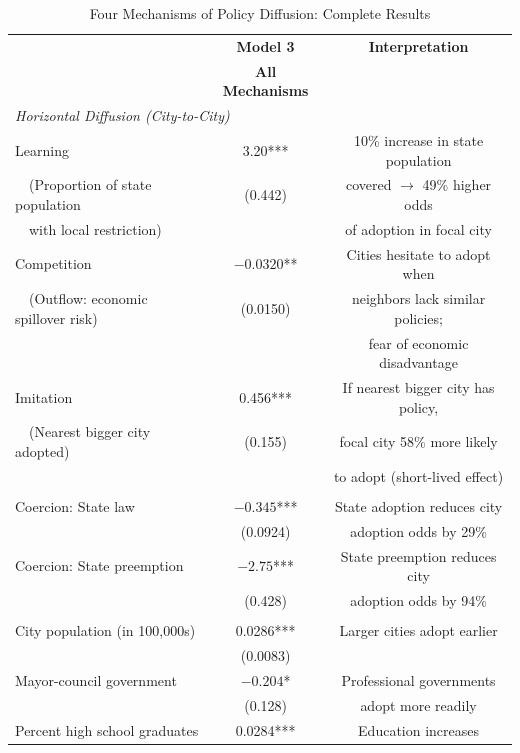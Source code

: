 \documentclass[12pt]{report}
\begin{document}
\begin{table}[htbp]
\centering
\caption{Four Mechanisms of Policy Diffusion: Complete Results \parencite{shipanMechanismsPolicyDiffusion2008a}}
\label{tab:shipan_volden_full}
\small
\begin{tabular}{lcc}
\toprule
& \textbf{Model 3} & \textbf{Interpretation} \\
& \textbf{All Mechanisms} & \\
\midrule
\multicolumn{3}{l}{\textit{Horizontal Diffusion (City-to-City)}} \\
\addlinespace
Learning & 3.20*** & 10\% increase in state population \\
~~(Proportion of state population & (0.442) & covered $\rightarrow$ 49\% higher odds \\
~~with local restriction) & & of adoption in focal city \\
\addlinespace
Competition & $-0.0320$** & Cities hesitate to adopt when \\
~~(Outflow: economic spillover risk) & (0.0150) & neighbors lack similar policies; \\
& & fear of economic disadvantage \\
\addlinespace
Imitation & 0.456*** & If nearest bigger city has policy, \\
~~(Nearest bigger city adopted) & (0.155) & focal city 58\% more likely \\
& & to adopt (short-lived effect) \\
\addlinespace
\midrule
\multicolumn{3}{l}{\textit{Vertical Diffusion (State-to-City)}} \\
\addlinespace
Coercion: State law & $-0.345$*** & State adoption reduces city \\
& (0.0924) & adoption odds by 29\% \\
\addlinespace
Coercion: State preemption & $-2.75$*** & State preemption reduces city \\
& (0.428) & adoption odds by 94\% \\
\addlinespace
\midrule
\multicolumn{3}{l}{\textit{Control Variables}} \\
\addlinespace
City population (in 100,000s) & 0.0286*** & Larger cities adopt earlier \\
& (0.0083) & \\
Mayor-council government & $-0.204$* & Professional governments \\
& (0.128) & adopt more readily \\
Percent high school graduates & 0.0284*** & Education increases \\

\end{tabular}
\end{table}
\end{document}
